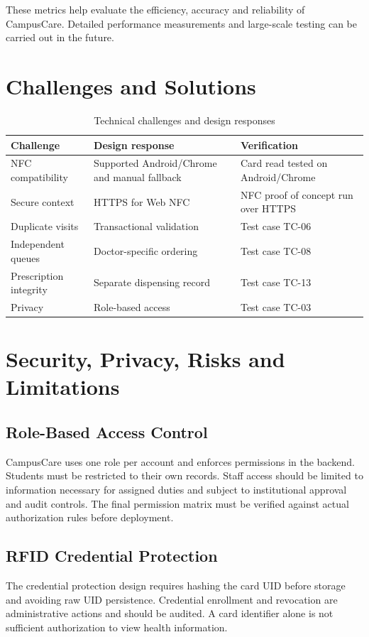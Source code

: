 \documentclass[a4paper,oneside,openany]{tietreport}
\begin{document}
These metrics help evaluate the efficiency, accuracy
and reliability of CampusCare. Detailed performance
measurements and large-scale testing can be carried
out in the future.

\chapter{Challenges and Solutions}
\begin{table}[!htbp]\centering\small
\caption{Technical challenges and design responses}
\begin{tabularx}{\linewidth}{@{}YYY@{}}\toprule
\textbf{Challenge} & \textbf{Design response} & \textbf{Verification}\\\midrule
NFC compatibility & Supported Android/Chrome and manual fallback & Card read tested on Android/Chrome\\
Secure context & HTTPS for Web NFC & NFC proof of concept run over HTTPS\\
Duplicate visits & Transactional validation & Test case TC-06\\
Independent queues & Doctor-specific ordering & Test case TC-08\\
Prescription integrity & Separate dispensing record & Test case TC-13\\
Privacy & Role-based access & Test case TC-03\\
\bottomrule\end{tabularx}\end{table}

\chapter{Security, Privacy, Risks and Limitations}
\section{Role-Based Access Control}
CampusCare uses one role per account and enforces permissions in the backend. Students must be restricted to their own records. Staff access should be limited to information necessary for assigned duties and subject to institutional approval and audit controls. The final permission matrix must be verified against actual authorization rules before deployment.

\section{RFID Credential Protection}
The credential protection design requires hashing the card UID before storage and avoiding raw UID persistence. Credential enrollment and revocation are administrative actions and should be audited. A card identifier alone is not sufficient authorization to view health information.
\end{document}
